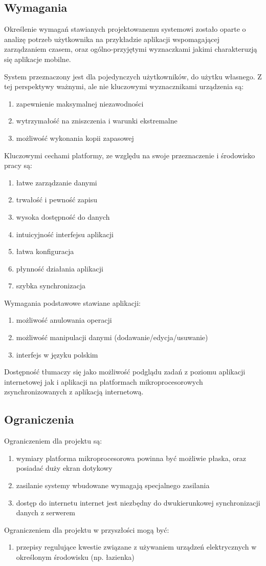 \subsection{Wymagania} %
Określenie wymagań stawianych projektowanemu systemowi zostało oparte o analizę potrzeb użytkownika na przykładzie aplikacji wspomagającej zarządzaniem czasem, oraz ogólno-przyjętymi wyznaczkami jakimi charakteruzją się aplikacje mobilne\cite{bib:mobile-paradigm}.


\label{sub:wymagania}
System przeznaczony jest dla pojedynczych użytkowników, do użytku własnego. Z tej perspektywy ważnymi, ale nie kluczowymi wyznacznikami urządzenia są:
\begin{enumerate}
	\item zapewnienie maksymalnej niezawodności
	\item wytrzymałość na zniszczenia i warunki ekstremalne
	\item możliwość wykonania kopii zapasowej
\end{enumerate}

Kluczowymi cechami platformy, ze względu na swoje przeznaczenie i środowisko pracy są:
\begin{enumerate}
	\item łatwe zarządzanie danymi
	\item trwałość i pewność zapisu
	\item wysoka dostępność do danych
	\item intuicyjność interfejsu aplikacji
	\item łatwa konfiguracja
	\item płynność działania aplikacji
	\item szybka synchronizacja
\end{enumerate}

Wymagania podstawowe stawiane aplikacji:
\begin{enumerate}
	\item możliwość anulowania operacji
	\item możliwość manipulacji danymi (dodawanie/edycja/usuwanie)
	\item interfejs w języku polskim
\end{enumerate}

Dostępność tłumaczy się jako możliwość podglądu zadań z poziomu aplikacji internetowej jak i aplikacji na platformach mikroprocesorowych zsynchronizowanych z aplikacją internetową.

\subsection{Ograniczenia} %
\label{sub:ograniczenia}
Ograniczeniem dla projektu są:
\begin{enumerate}
	\item wymiary
	\subitem platforma mikroprocesorowa powinna być możliwie płaska, oraz posiadać duży ekran dotykowy
	\item zasilanie
	\subitem systemy wbudowane wymagają specjalnego zasilania
	\item dostęp do internetu
	\subitem internet jest niezbędny do dwukierunkowej synchronizacji danych z serwerem
\end{enumerate}

Ograniczeniem dla projektu w przyszłości mogą być:
\begin{enumerate}
	\item przepisy regulujące kwestie związane z używaniem urządzeń elektrycznych w określonym środowisku (np. łazienka)
\end{enumerate}
